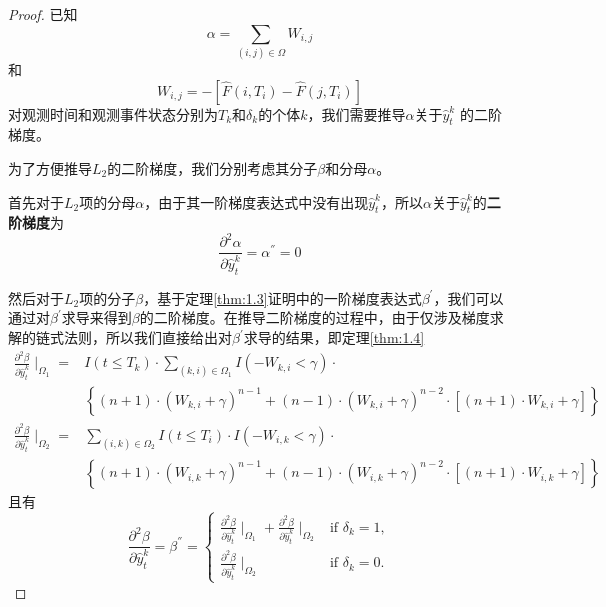 \begin{proof}
已知$$\alpha = \sum_{(i,j)\in \Omega} W_{i,j}$$ 和 $$W_{i,j} = -\left[ \hat{F}(i, T_i) - \hat{F}(j, T_i) \right]$$ 对观测时间和观测事件状态分别为$T_k$和$\delta_k$的个体$k$，我们需要推导$\alpha$关于$\hat{y}_t^k$ 的二阶梯度。

为了方便推导$L_2$的二阶梯度，我们分别考虑其分子$\beta$和分母$\alpha$。

首先对于$L_2$项的分母$\alpha$，由于其一阶梯度表达式中没有出现$\hat{y}_t^k$，所以$\alpha$关于$\hat{y}_t^k$的\textbf{二阶梯度}为$$
\frac{\partial^2 \alpha}{\partial \hat{y}_t^k}=\alpha^{''}=0
$$

然后对于$L_2$项的分子$\beta$，基于定理\ref{thm:1.3}证明中的一阶梯度表达式$\beta^{'}$，我们可以通过对$\beta^{'}$求导来得到$\beta$的二阶梯度。在推导二阶梯度的过程中，由于仅涉及梯度求解的链式法则，所以我们直接给出对$\beta^{'}$求导的结果，即定理\ref{thm:1.4}\[
\begin{split}
\frac{\partial^2 \beta}{\partial \hat{y}_t^k} \mid_{\Omega_1} =& I(t\le T_k)\cdot \sum\limits_{(k,i)\in \Omega_1} I(-W_{k,i}<\gamma)\cdot \\
  & \left\{(n+1)\cdot (W_{k,i}+\gamma)^{n-1} + (n-1)\cdot (W_{k,i}+\gamma)^{n-2}\cdot [(n+1)\cdot W_{k,i}+\gamma]\right\} \\
\frac{\partial^2 \beta}{\partial \hat{y}_t^k} \mid_{\Omega_2} =& \sum\limits_{(i,k)\in \Omega_2} I(t\le T_i)\cdot I(-W_{i,k}<\gamma)\cdot \\
  & \left\{(n+1)\cdot (W_{i,k}+\gamma)^{n-1} + (n-1)\cdot (W_{i,k}+\gamma)^{n-2}\cdot [(n+1)\cdot W_{i,k}+\gamma]\right\}
\end{split}
\] 且有$$
\frac{\partial^2 \beta}{\partial \hat{y}_t^k}=\beta^{''}=
\begin{cases}
\frac{\partial^2 \beta}{\partial \hat{y}_t^k} \mid_{\Omega_1} + \frac{\partial^2 \beta}{\partial \hat{y}_t^k} \mid_{\Omega_2} & \text{if } \delta_k = 1,\\
\frac{\partial^2 \beta}{\partial \hat{y}_t^k} \mid_{\Omega_2} & \text{if } \delta_k = 0.
\end{cases}
$$
\end{proof}

